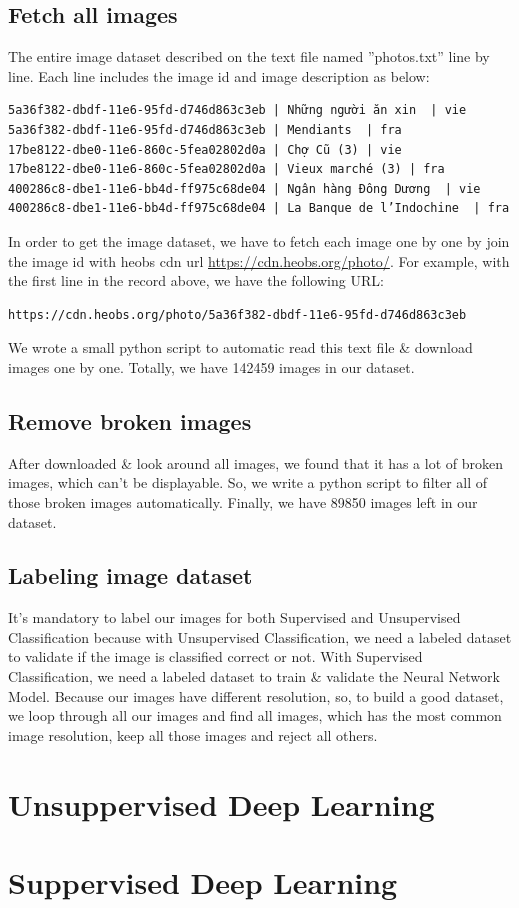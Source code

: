 \documentclass[hidelinks,12pt,a4paper]{report}
\begin{document}
\section{Fetch all images}
The entire image dataset described on the text file named ”photos.txt” line by line. Each line includes the image id and image description as below:
\begin{verbatim}
5a36f382-dbdf-11e6-95fd-d746d863c3eb | Những người ăn xin  | vie
5a36f382-dbdf-11e6-95fd-d746d863c3eb | Mendiants  | fra
17be8122-dbe0-11e6-860c-5fea02802d0a | Chợ Cũ (3) | vie
17be8122-dbe0-11e6-860c-5fea02802d0a | Vieux marché (3) | fra
400286c8-dbe1-11e6-bb4d-ff975c68de04 | Ngân hàng Đông Dương  | vie
400286c8-dbe1-11e6-bb4d-ff975c68de04 | La Banque de l’Indochine  | fra
\end{verbatim}
In order to get the image dataset, we have to fetch each image one by one by join the image id with heobs cdn url \href{https://cdn.heobs.org/photo/}{https://cdn.heobs.org/photo/}. For example, with the first line in the record above, we have the following URL: 
\begin{verbatim}
https://cdn.heobs.org/photo/5a36f382-dbdf-11e6-95fd-d746d863c3eb
\end{verbatim}
We wrote a small python script to automatic read this text file \& download images one by one.
Totally, we have 142459 images in our dataset.

\section{Remove broken images}
After downloaded \& look around all images, we found that it has a lot of broken images, which can't be displayable. So, we write a python script to filter all of those broken images automatically. \newline
Finally, we have 89850 images left in our dataset.

\section{Labeling image dataset}
It's mandatory to label our images for both Supervised and Unsupervised Classification because with Unsupervised Classification, we need a labeled dataset to validate if the image is classified correct or not. With Supervised Classification, we need a labeled dataset to train \& validate the Neural Network Model.\newline\newline
Because our images have different resolution, so, to build a good dataset, we loop through all our images and find all images, which has the most common image resolution, keep all those images and reject all others.


\chapter{Unsuppervised Deep Learning}
\chapter{Suppervised Deep Learning}



\end{document}
